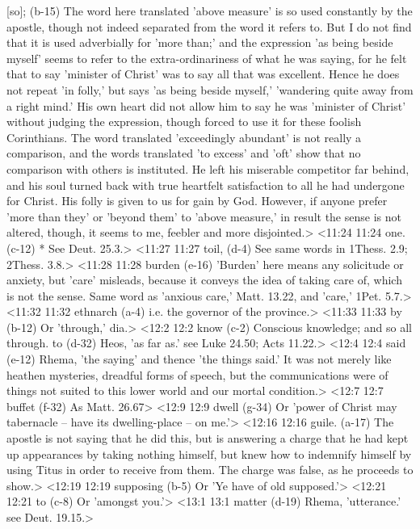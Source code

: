   [so]; (b-15)  The word here translated 'above measure' is so used  constantly by the apostle, though not indeed separated from the  word it refers to. But I do not find that it is used  adverbially for 'more than;' and the expression 'as being  beside myself' seems to refer to the extra-ordinariness of what  he was saying, for he felt that to say 'minister of Christ'  was to say all that was excellent. Hence he does not repeat 'in  folly,' but says 'as being beside myself,' 'wandering quite  away from a right mind.' His own heart did not allow him to say  he was 'minister of Christ' without judging the expression,  though forced to use it for these foolish Corinthians. The word  translated 'exceedingly abundant' is not really a comparison,  and the words translated 'to excess' and 'oft' show that no  comparison with others is instituted. He left his miserable  competitor far behind, and his soul turned back with true  heartfelt satisfaction to all he had undergone for Christ. His  folly is given to us for gain by God. However, if anyone prefer  'more than they' or 'beyond them' to 'above measure,' in result  the sense is not altered, though, it seems to me, feebler and  more disjointed.>
<11:24 11:24  one. (c-12)  * See Deut. 25.3.>
<11:27 11:27  toil, (d-4)  See same words in 1Thess. 2.9; 2Thess. 3.8.>
<11:28 11:28  burden (e-16)  'Burden' here means any solicitude or anxiety, but 'care'  misleads, because it conveys the idea of taking care of, which  is not the sense. Same word as 'anxious care,' Matt. 13.22, and  'care,' 1Pet. 5.7.>
<11:32 11:32  ethnarch (a-4)  i.e. the governor of the province.>
<11:33 11:33  by (b-12)  Or 'through,' dia.>
<12:2 12:2  know (c-2)  Conscious knowledge; and so all through.
  to (d-32)  Heos, 'as far as.' see Luke 24.50; Acts 11.22.>
<12:4 12:4  said (e-12)  Rhema, 'the saying' and thence 'the things said.' It was  not merely like heathen mysteries, dreadful forms of speech,  but the communications were of things not suited to this lower  world and our mortal condition.>
<12:7 12:7  buffet (f-32)  As Matt. 26.67>
<12:9 12:9  dwell (g-34)  Or 'power of Christ may tabernacle -- have its dwelling-place  -- on me.'>
<12:16 12:16  guile. (a-17)  The apostle is not saying that he did this, but is answering  a charge that he had kept up appearances by taking nothing  himself, but knew how to indemnify himself by using Titus in  order to receive from them. The charge was false, as he  proceeds to show.>
<12:19 12:19  supposing (b-5)  Or 'Ye have of old supposed.'>
<12:21 12:21  to (c-8)  Or 'amongst you.'>
<13:1 13:1  matter (d-19)  Rhema, 'utterance.' see Deut. 19.15.>
